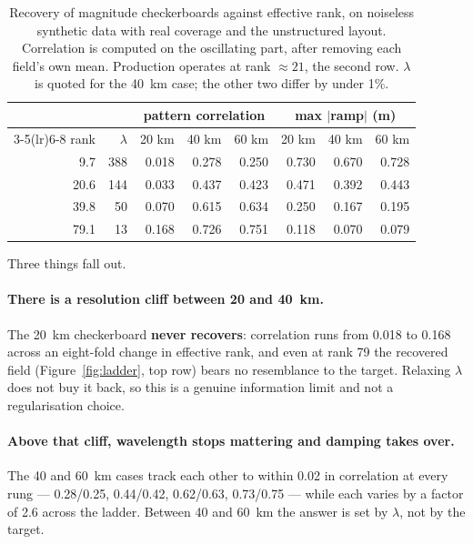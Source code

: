 \documentclass[11pt,a4paper]{article}
\begin{document}
\begin{table}[htbp]
\centering
\small
\begin{tabular}{rrrrrrrr}
\toprule
& & \multicolumn{3}{c}{pattern correlation} & \multicolumn{3}{c}{max $|$ramp$|$ (m)} \\
\cmidrule(lr){3-5}\cmidrule(lr){6-8}
rank & $\lambda$ & 20 km & 40 km & 60 km & 20 km & 40 km & 60 km \\
\midrule
 9.7 & 388 & 0.018 & 0.278 & 0.250 & 0.730 & 0.670 & 0.728 \\
20.6 & 144 & 0.033 & 0.437 & 0.423 & 0.471 & 0.392 & 0.443 \\
39.8 &  50 & 0.070 & 0.615 & 0.634 & 0.250 & 0.167 & 0.195 \\
79.1 &  13 & 0.168 & 0.726 & 0.751 & 0.118 & 0.070 & 0.079 \\
\bottomrule
\end{tabular}
\caption{Recovery of magnitude checkerboards against effective rank, on noiseless
synthetic data with real coverage and the unstructured layout. Correlation is
computed on the oscillating part, after removing each field's own mean.
Production operates at rank $\approx 21$, the second row. $\lambda$ is quoted for
the 40~km case; the other two differ by under 1\%.}
\label{tab:ladder}
\end{table}

Three things fall out.

\paragraph{There is a resolution cliff between 20 and 40~km.} The 20~km
checkerboard \textbf{never recovers}: correlation runs from 0.018 to 0.168 across
an eight-fold change in effective rank, and even at rank 79 the recovered field
(Figure~\ref{fig:ladder}, top row) bears no resemblance to the target. Relaxing
$\lambda$ does not buy it back, so this is a genuine information limit and not a
regularisation choice.

\paragraph{Above that cliff, wavelength stops mattering and damping takes over.}
The 40 and 60~km cases track each other to within 0.02 in correlation at every
rung --- 0.28/0.25, 0.44/0.42, 0.62/0.63, 0.73/0.75 --- while each varies by a
factor of 2.6 across the ladder. Between 40 and 60~km the answer is set by
$\lambda$, not by the target.
\end{document}
